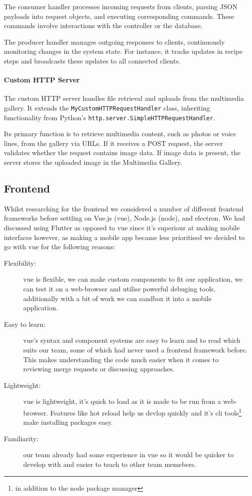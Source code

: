 \documentclass{article}
\begin{document}
    The consumer handler processes incoming requests from clients, parsing JSON payloads into request objects, and executing corresponding commands. These commands involve interactions with the controller or the database.
    
    The producer handler manages outgoing responses to clients, continuously monitoring changes in the system state. For instance, it tracks updates in recipe steps and broadcasts these updates to all connected clients. 
    
    \paragraph{Custom HTTP Server}
    The custom HTTP server handles file retrieval and uploads from the multimedia gallery. It extends the \verb|MyCustomHTTPRequestHandler| class, inheriting functionality from Python's \verb|http.server.SimpleHTTPRequestHandler|.
    
    Its primary function is to retrieve multimedia content, such as photos or voice lines, from the gallery via URLs. If it receives a POST request, the server validates whether the request contains image data. If image data is present, the server stores the uploaded image in the Multimedia Gallery.
    
    \subsection{Frontend}
    Whilst researching for the frontend we considered a number of different frontend frameworks before settling on Vue.js (vue), Node.js (node), and electron. We had discussed using Flutter as opposed to vue since it's superiour at making mobile interfaces however, as making a mobile app became less prioritised we decided to go with vue for the following reasons: 
    \begin{description}
      \item[Flexibility:] vue is flexible, we can make custom components to fit our application, we can test it on a web-browser and utilise powerful debuging tools, additionally with a bit of work we can sandbox it into a mobile application.
      \item[Easy to learn:] vue's syntax and component systems are easy to learn and to read which suits our team, some of which had never used a frontend framework before. This makes understanding the code much easier when it comes to reviewing merge requests or discussing approaches.
      \item[Lightweight:] vue is lightweight, it's quick to load as it is made to be run from a web-browser. Features like hot reload help us devlop quickly and it's cli tools\footnote{in addition to the node package manager} make installing packages easy.
      \item[Familiarity:] our team already had some experience in vue so it would be quicker to develop with and easier to teach to other team memebers.
    \end{description}
\end{document}
